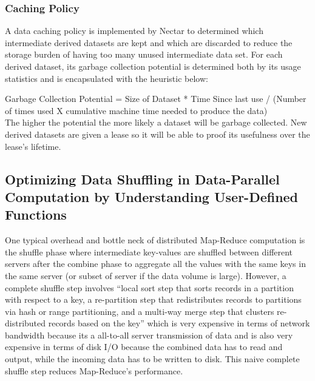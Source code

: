\documentclass[]{article}
\begin{document}
\subsubsection{Caching Policy}
A data caching policy is implemented by Nectar to determined which intermediate derived datasets are kept and which are discarded to reduce the storage burden of having too many unused intermediate data set. For each derived dataset, its garbage collection potential is determined both by its usage statistics and is encapsulated with the heuristic below:

Garbage Collection Potential = Size of Dataset * Time Since last use / (Number of times used X cumulative machine time needed to produce the data)\\

The higher the potential the more likely a dataset will be garbage collected. New derived datasets are given a lease so it will be able to proof its usefulness over the lease’s lifetime.\\

\subsection{Optimizing Data Shuffling in Data-Parallel Computation by Understanding User-Defined Functions}

One typical overhead and bottle neck of distributed Map-Reduce computation is the shuffle phase where intermediate key-values are shuffled between different servers after the combine phase to aggregate all the values with the same keys in the same server (or subset of server if the data volume is large). However, a complete shuffle step involves “local sort step that sorts records in a partition with respect to a key, a re-partition step that redistributes records to partitions via hash or range partitioning, and a multi-way merge step that clusters re-distributed records based on the key” which is very expensive in terms of network bandwidth because its a all-to-all server transmission of data and is also very expensive in terms of disk I/O because the combined data has to read and output, while the incoming data has to be written to disk. This naive complete shuffle step reduces Map-Reduce’s performance.  \\
\end{document}
